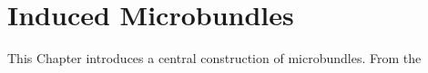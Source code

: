 \chapter{Induced Microbundles}
\begin{myparagraph}
    This Chapter introduces a central construction of microbundles.
    From the 
\end{myparagraph}





